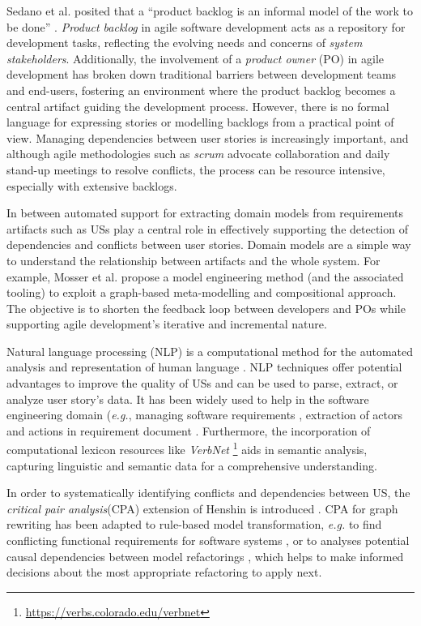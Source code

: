 Sedano et al. posited that a \enquote{product backlog is an informal model of the work to be done} \cite{sedano2019product}. \emph{Product backlog} in agile software development acts as a repository for development tasks, reflecting the evolving needs and concerns of \emph{system stakeholders}\cite{sedano2019product}. Additionally, the involvement of a \emph{product owner} (PO) in agile development has broken down traditional barriers between development teams and end-users, fostering an environment where the product backlog becomes a central artifact guiding the development process\cite{sedano2019product}. However, there is no formal language for expressing stories or modelling backlogs from a practical point of view. Managing dependencies between user stories is increasingly important, and although agile methodologies such as \emph{scrum} advocate collaboration and daily stand-up meetings to resolve conflicts, the process can be resource intensive, especially with extensive backlogs.

In between automated support for extracting domain models from requirements artifacts such as USs play a central role in effectively supporting the detection of dependencies and conflicts between user stories. Domain models are a simple way to understand the relationship between artifacts and the whole system. For example, Mosser et al. propose a model engineering method (and the associated tooling) to exploit a graph-based meta-modelling and compositional approach. The objective is to shorten the feedback loop between developers and POs while supporting agile development’s iterative and incremental nature\cite{mosser2022modelling}.

Natural language processing (NLP) is a computational method for the automated analysis and representation of human language \cite{cambria2014jumping}. NLP techniques offer potential advantages to improve the quality of USs and can be used to parse, extract, or analyze user story's data. It has been widely used to help in the software engineering domain (\emph{e.g.}, managing software requirements \cite{Arias2018}, extraction of actors and actions in requirement document \cite{al2018use}. Furthermore, the incorporation of computational lexicon resources like  \emph{VerbNet} \footnote{\href{https://verbs.colorado.edu/verbnet}{https://verbs.colorado.edu/verbnet}} aids in semantic analysis, capturing linguistic and semantic data for a comprehensive understanding.

In order to systematically identifying conflicts and dependencies between US, the \emph{critical pair analysis}(CPA) extension of Henshin is introduced \cite{gomez2010systematic}. CPA for graph rewriting \cite{hartmanis2006monographs} has been adapted to rule-based model transformation, \emph{e.g.} to find conflicting functional requirements for software systems \cite{hausmann2002detection}, or to analyses potential causal dependencies between model refactorings \cite{mens2007analysing}, which helps to make informed decisions about the most appropriate refactoring to apply next.

